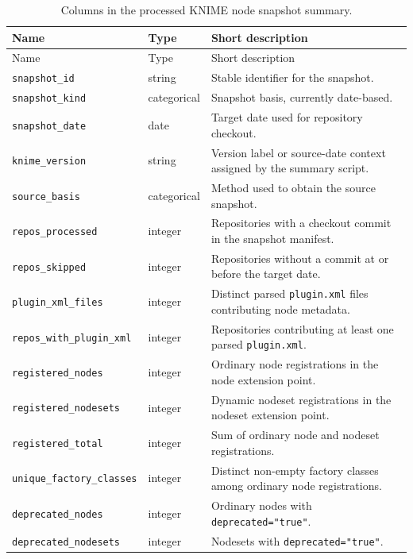 \documentclass[runningheads]{llncs}
\begin{document}
\begingroup
\small
\begin{longtable}{%
  >{\raggedright\arraybackslash}p{}
  >{\raggedright\arraybackslash}p{}
  >{\raggedright\arraybackslash}p{}}
\caption{Columns in the processed KNIME node snapshot summary.}
\label{tab:summary-columns}\\
\toprule
Name & Type & Short description \\
\midrule
\endfirsthead
\toprule
Name & Type & Short description \\
\midrule
\endhead
\bottomrule
\endfoot
\texttt{snapshot\_id} & string &
Stable identifier for the snapshot. \\
\texttt{snapshot\_kind} & categorical &
Snapshot basis, currently date-based. \\
\texttt{snapshot\_date} & date &
Target date used for repository checkout. \\
\texttt{knime\_version} & string &
Version label or source-date context assigned by the summary script. \\
\texttt{source\_basis} & categorical &
Method used to obtain the source snapshot. \\
\texttt{repos\_processed} & integer &
Repositories with a checkout commit in the snapshot manifest. \\
\texttt{repos\_skipped} & integer &
Repositories without a commit at or before the target date. \\
\texttt{plugin\_xml\_files} & integer &
Distinct parsed \texttt{plugin.xml} files contributing node metadata. \\
\texttt{repos\_with\_plugin\_xml} & integer &
Repositories contributing at least one parsed \texttt{plugin.xml}. \\
\texttt{registered\_nodes} & integer &
Ordinary node registrations in the node extension point. \\
\texttt{registered\_nodesets} & integer &
Dynamic nodeset registrations in the nodeset extension point. \\
\texttt{registered\_total} & integer &
Sum of ordinary node and nodeset registrations. \\
\texttt{unique\_factory\_classes} & integer &
Distinct non-empty factory classes among ordinary node registrations. \\
\texttt{deprecated\_nodes} & integer &
Ordinary nodes with \texttt{deprecated="true"}. \\
\texttt{deprecated\_nodesets} & integer &
Nodesets with \texttt{deprecated="true"}. \\

\end{longtable}
\end{document}
